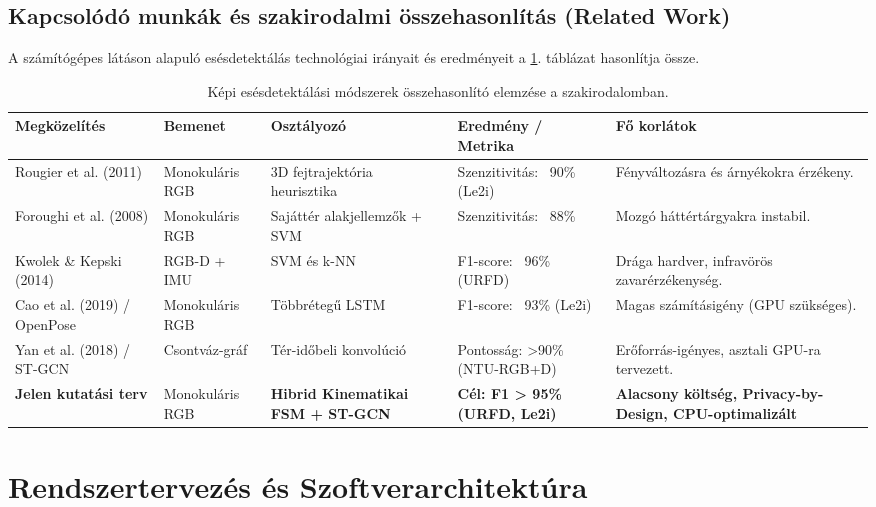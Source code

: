 \documentclass[12pt,a4paper,oneside]{report}
\begin{document}
\section{Kapcsolódó munkák és szakirodalmi összehasonlítás (Related Work)}
A számítógépes látáson alapuló esésdetektálás technológiai irányait és eredményeit a \ref{tab:related_work}. táblázat hasonlítja össze.

\begin{table}[H]
\centering
\small
\begin{tabularx}{\textwidth}{p{3.2cm}p{2.2cm}p{2.8cm}p{2.8cm}X}
\toprule
\textbf{Megközelítés} & \textbf{Bemenet} & \textbf{Osztályozó} & \textbf{Eredmény / Metrika} & \textbf{Fő korlátok} \\
\midrule
Rougier et al. (2011) \cite{rougier2011} & Monokuláris RGB & 3D fejtrajektória heurisztika & Szenzitivitás: ~90\% (Le2i) & Fényváltozásra és árnyékokra érzékeny. \\
Foroughi et al. (2008) \cite{foroughi2008} & Monokuláris RGB & Sajáttér alakjellemzők + SVM & Szenzitivitás: ~88\% & Mozgó háttértárgyakra instabil. \\
Kwolek \& Kepski (2014) \cite{kwolek2014} & RGB-D + IMU & SVM és k-NN & F1-score: ~96\% (URFD) & Drága hardver, infravörös zavarérzékenység. \\
Cao et al. (2019) / OpenPose \cite{cao2019openpose} & Monokuláris RGB & Többrétegű LSTM & F1-score: ~93\% (Le2i) & Magas számításigény (GPU szükséges). \\
Yan et al. (2018) / ST-GCN \cite{yan2018stgcn} & Csontváz-gráf & Tér-időbeli konvolúció & Pontosság: >90\% (NTU-RGB+D) & Erőforrás-igényes, asztali GPU-ra tervezett. \\
\midrule
\textbf{Jelen kutatási terv} & Monokuláris RGB & \textbf{Hibrid Kinematikai FSM + ST-GCN} & \textbf{Cél: F1 > 95\% (URFD, Le2i)} & \textbf{Alacsony költség, Privacy-by-Design, CPU-optimalizált} \\
\bottomrule
\end{tabularx}
\caption{Képi esésdetektálási módszerek összehasonlító elemzése a szakirodalomban.}
\label{tab:related_work}
\end{table}

\chapter{Rendszertervezés és Szoftverarchitektúra}
\end{document}
